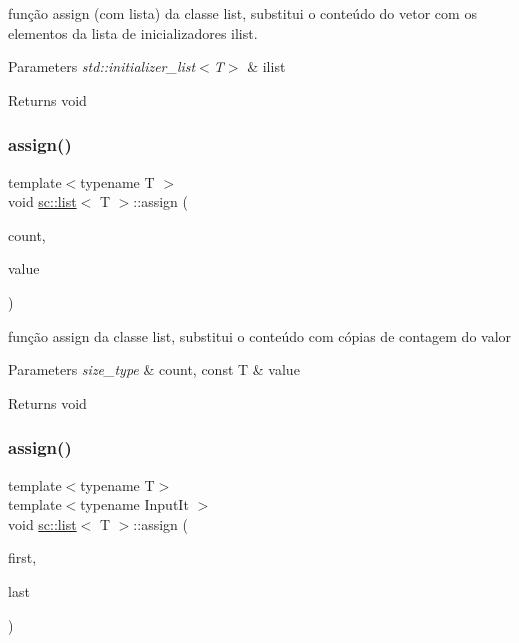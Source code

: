 função assign (com lista) da classe list, substitui o conteúdo do vetor com os elementos da lista de inicializadores ilist. 
\begin{DoxyParams}{Parameters}
{\em std\+::initializer\+\_\+list$<$\+T$>$} & ilist \\
\hline
\end{DoxyParams}
\begin{DoxyReturn}{Returns}
void 
\end{DoxyReturn}
\mbox{\label{classsc_1_1list_a3578c78367327dba848baa746882640a}} 
\subsubsection{\texorpdfstring{assign()}{assign()}\hspace{0.1cm}{\footnotesize\ttfamily [3/6]}}
{\footnotesize\ttfamily template$<$typename T $>$ \\
void \mbox{\hyperlink{classsc_1_1list}{sc\+::list}}$<$ T $>$\+::assign (\begin{DoxyParamCaption}\item[{size\+\_\+type}]{count,  }\item[{const T \&}]{value }\end{DoxyParamCaption})}

função assign da classe list, substitui o conteúdo com cópias de contagem do valor 
\begin{DoxyParams}{Parameters}
{\em size\+\_\+type} & count, const T \& value \\
\hline
\end{DoxyParams}
\begin{DoxyReturn}{Returns}
void 
\end{DoxyReturn}
\mbox{\label{classsc_1_1list_a5886cd0296e187a96777dd837eaed99b}} 
\subsubsection{\texorpdfstring{assign()}{assign()}\hspace{0.1cm}{\footnotesize\ttfamily [4/6]}}
{\footnotesize\ttfamily template$<$typename T$>$ \\
template$<$typename Input\+It $>$ \\
void \mbox{\hyperlink{classsc_1_1list}{sc\+::list}}$<$ T $>$\+::assign (\begin{DoxyParamCaption}\item[{Input\+It}]{first,  }\item[{Input\+It}]{last }\end{DoxyParamCaption})}

